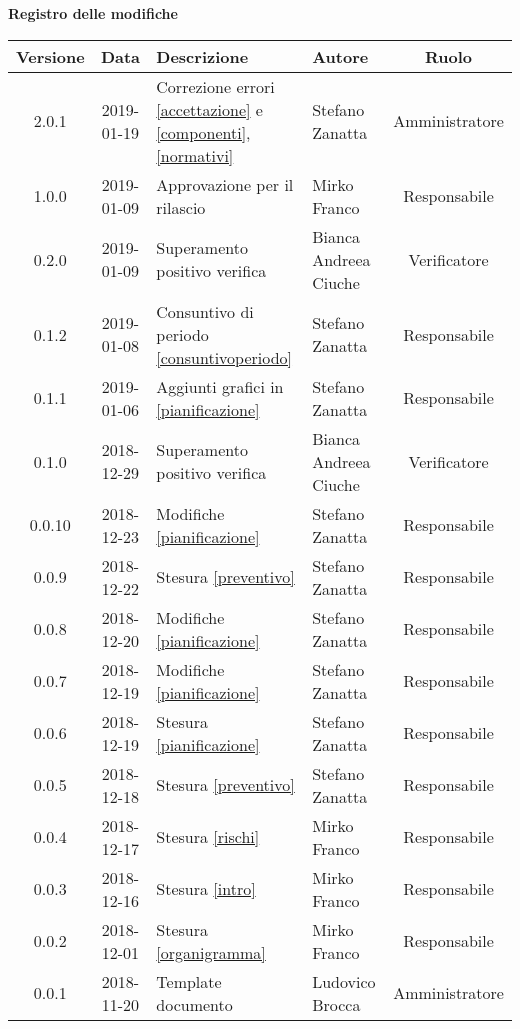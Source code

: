 	\begin{center}
		\textbf{Registro delle modifiche}
	\end{center}
	\begin{center}
		\begin{tabularx}{\textwidth}{|c|c|X|X|c|}
			\hline
			\textbf{Versione} & \textbf{Data} & \textbf{Descrizione} & \textbf{Autore} & \textbf{Ruolo} \\
			\hline
			2.0.1 & 2019-01-19 & Correzione errori \ref{accettazione} e \ref{componenti},\ref{normativi} & Stefano Zanatta & Amministratore\\
			\hline
			1.0.0 & 2019-01-09 & Approvazione per il rilascio & Mirko Franco & Responsabile\\
			\hline
			0.2.0 & 2019-01-09 & Superamento positivo verifica & Bianca Andreea Ciuche& Verificatore\\
			\hline
			0.1.2 & 2019-01-08 & Consuntivo di periodo \ref{consuntivoperiodo} & Stefano Zanatta & Responsabile\\
			\hline
			0.1.1 & 2019-01-06 & Aggiunti grafici in \ref{pianificazione} & Stefano Zanatta & Responsabile\\
			\hline
			0.1.0 & 2018-12-29 & Superamento positivo verifica & Bianca Andreea Ciuche& Verificatore\\
			\hline
			0.0.10 & 2018-12-23 & Modifiche \ref{pianificazione} & Stefano Zanatta & Responsabile\\
			\hline
			0.0.9 & 2018-12-22 & Stesura \ref{preventivo} & Stefano Zanatta & Responsabile\\
			\hline
			0.0.8 & 2018-12-20 & Modifiche \ref{pianificazione}& Stefano Zanatta & Responsabile\\
			\hline
			0.0.7 & 2018-12-19 & Modifiche \ref{pianificazione}& Stefano Zanatta & Responsabile\\
			\hline
			0.0.6 & 2018-12-19 & Stesura \ref{pianificazione} & Stefano Zanatta & Responsabile\\
			\hline
			0.0.5 & 2018-12-18 & Stesura \ref{preventivo} & Stefano Zanatta & Responsabile\\
			\hline
			0.0.4 & 2018-12-17 & Stesura \ref{rischi} & Mirko Franco & Responsabile\\
			\hline
			0.0.3 & 2018-12-16 & Stesura \ref{intro} &Mirko Franco& Responsabile\\
			\hline
			0.0.2 & 2018-12-01 & Stesura \ref{organigramma} &Mirko Franco& Responsabile\\
			\hline
			0.0.1 & 2018-11-20 & Template documento& Ludovico Brocca & Amministratore\\			
			\hline
			
		\end{tabularx}
	\end{center}
\newpage